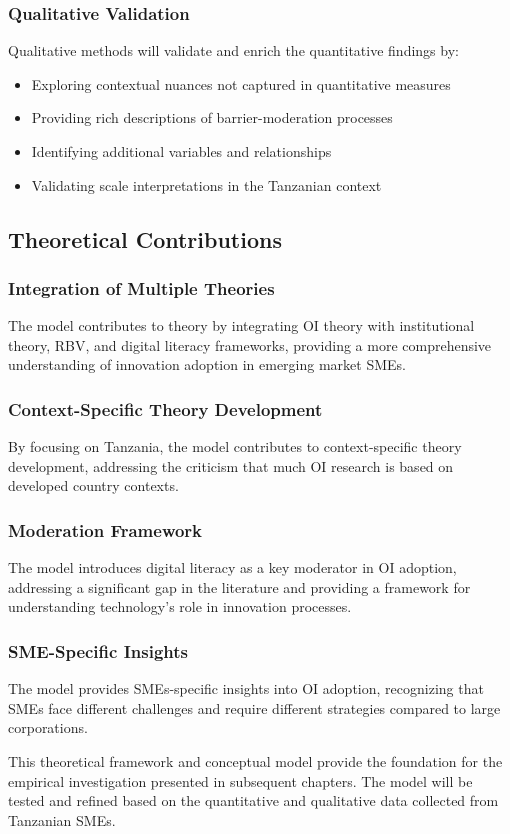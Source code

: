 \subsubsection{Qualitative Validation}
Qualitative methods will validate and enrich the quantitative findings by:
\begin{itemize}
    \item Exploring contextual nuances not captured in quantitative measures
    \item Providing rich descriptions of barrier-moderation processes
    \item Identifying additional variables and relationships
    \item Validating scale interpretations in the Tanzanian context
\end{itemize}

\subsection{Theoretical Contributions}

\subsubsection{Integration of Multiple Theories}
The model contributes to theory by integrating OI theory with institutional theory, RBV, and digital literacy frameworks, providing a more comprehensive understanding of innovation adoption in emerging market SMEs.

\subsubsection{Context-Specific Theory Development}
By focusing on Tanzania, the model contributes to context-specific theory development, addressing the criticism that much OI research is based on developed country contexts.

\subsubsection{Moderation Framework}
The model introduces digital literacy as a key moderator in OI adoption, addressing a significant gap in the literature and providing a framework for understanding technology's role in innovation processes.

\subsubsection{SME-Specific Insights}
The model provides SMEs-specific insights into OI adoption, recognizing that SMEs face different challenges and require different strategies compared to large corporations.

This theoretical framework and conceptual model provide the foundation for the empirical investigation presented in subsequent chapters. The model will be tested and refined based on the quantitative and qualitative data collected from Tanzanian SMEs.